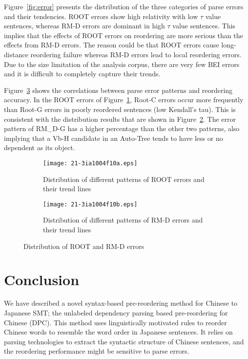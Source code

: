 \documentclass[english]{jnlp_1.4}
\begin{document}
Figure~\ref{fig:error} presents the distribution of the three categories of parse 
errors and their tendencies. ROOT errors show high relativity with low $\tau$ 
value sentences, whereas RM-D errors are dominant in high $\tau$ value 
sentences. This implies that the effects of ROOT errors on reordering are more 
serious than the effects from RM-D errors. The reason could be that ROOT errors 
cause long-distance reordering failure whereas RM-D errors lead to local reordering 
errors. Due to the size limitation of the analysis corpus, there are very few BEI 
errors and it is difficult to completely capture their trends.

Figure~\ref{fig:rootrmderr} shows the correlations between parse error patterns 
and reordering accuracy. In the ROOT errors of Figure~\ref{fig:rooterr}, Root-C errors
occur more frequently than Root-G errors in poorly reordered sentences (low Kendall's tau).
This is consistent with the distribution results 
that are shown in Figure~\ref{fig:rmderr}. The error pattern of RM\_D-G has a higher
percentage than the other two patterns, also implying that a Vb-H candidate 
in an Auto-Tree tends to have less or no dependent as its object.

\begin{figure}[t]
\begin{subfigure}{195pt}
\begin{center}
\texttt{[image: 21-3ia1004f10a.eps]}
\end{center}
\caption{Distribution of different patterns of ROOT errors and their trend lines}
\label{fig:rooterr}
\end{subfigure}
\hfill
\begin{subfigure}{195pt}
\begin{center}
\texttt{[image: 21-3ia1004f10b.eps]}
\end{center}
\caption{Distribution of different patterns of RM-D errors and their trend lines}
\label{fig:rmderr}
\end{subfigure}
\caption{Distribution of ROOT and RM-D errors}
\label{fig:rootrmderr}
\end{figure}


\section{Conclusion}
\label{sec:con}

We have described a novel syntax-based pre-reordering method for Chinese to 
Japanese SMT; the unlabeled dependency parsing based pre-reordering for Chinese (DPC). 
This method uses linguistically motivated rules to reorder Chinese words to 
resemble the word order in Japanese sentences. It relies on parsing technologies 
to extract the syntactic structure of Chinese sentences, and the reordering 
performance might be sensitive to parse errors.
\end{document}
